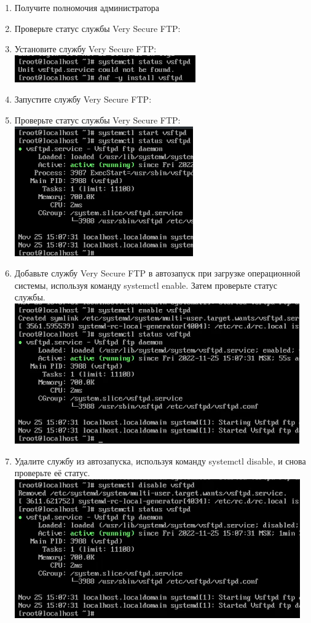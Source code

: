 \documentclass[12pt]{article}
\begin{document}
\begin{enumerate}
	\item Получите полномочия администратора
	\item Проверьте статус службы Very Secure FTP:
	\item Установите службу Very Secure FTP: \\
	      \includegraphics{1.png}
	\item Запустите службу Very Secure FTP:
	\item Проверьте статус службы Very Secure FTP: \\
	      \includegraphics{2.png}
	\item Добавьте службу Very Secure FTP в автозапуск при загрузке операционной системы, используя команду systemctl enable. Затем проверьте статус службы. \\
	      \includegraphics{3.png}
	\item Удалите службу из автозапуска, используя команду systemctl disable, и снова проверьте её статус. \\
	      \includegraphics{4.png}

\end{enumerate}
\end{document}
